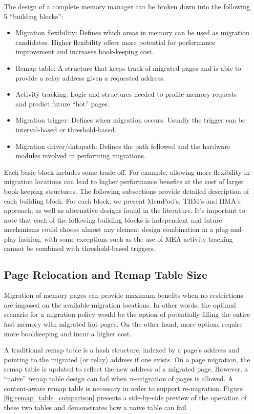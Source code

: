 The design of a complete memory manager can be broken down into the following 5 ``building blocks'':
\begin{itemize}
\item Migration flexibility: Defines which areas in memory can be used as migration candidates. Higher flexibility offers more potential for performance improvement and increases book-keeping cost.
\item Remap table: A structure that keeps track of migrated pages and is able to provide a relay address given a requested address.
\item Activity tracking: Logic and structures needed to profile memory requests and predict future ``hot'' pages.
\item Migration trigger: Defines when migration occurs. Usually the trigger can be interval-based or threshold-based.
\item Migration driver/datapath: Defines the path followed and the hardware modules involved in performing migrations.
\end{itemize}

Each basic block includes some trade-off. For example, allowing more flexibility in migration locations can lead to higher performance benefits at the cost of larger book-keeping structures. The following subsections provide detailed description of each building block. For each block, we present MemPod's, THM's and HMA's approach, as well as alternative designs found in the literature. It's important to note that each of the following building blocks is independent and future mechanisms could choose almost any element design combination in a plug-and-play fashion, with some exceptions such as the use of MEA activity tracking cannot be combined with threshold-based triggers.

\subsection{Page Relocation and Remap Table Size}
\label{sec:relocation}

Migration of memory pages can provide maximum benefits when no restrictions are imposed on the available migration locations. In other words, the optimal scenario for a migration policy would be the option of potentially filling the entire fast memory with migrated hot pages. On the other hand, more options require more bookkeeping and incur a higher cost.

A traditional remap table is a hash structure, indexed by a page's address and pointing to the migrated (or relay) address if one exists. On a page migration, the remap table is updated to reflect the new address of a migrated page. However, a ``naive'' remap table design can fail when re-migration of pages is allowed. A content-aware remap table is necessary in order to support re-migration. Figure \ref{fig:remap_table_comparison} presents a side-by-side preview of the operation of these two tables and demonstrates how a naive table can fail.

